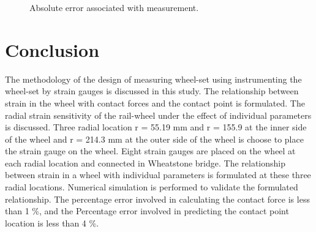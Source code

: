 \documentclass[]{interact}
\theoremstyle{plain}%
\theoremstyle{definition}
\theoremstyle{remark}
\begin{document}
\begin{figure}[h]
\caption{Absolute error associated with measurement.} \label{validation}
\end{figure}


\section{Conclusion}
The methodology of the design of measuring wheel-set using instrumenting the wheel-set by strain gauges is discussed in this study.  The relationship between strain in the wheel with contact forces and the contact point is formulated.  The radial strain sensitivity of the rail-wheel under the effect of individual parameters is discussed. Three radial location r = 55.19 mm and r = 155.9 at the inner side of the wheel and r = 214.3 mm at the outer side of the wheel is choose to place the strain gauge on the wheel. Eight strain gauges are placed on the wheel at each radial location and connected in Wheatstone bridge. The relationship between strain in a wheel with individual parameters is formulated at these three radial locations.  Numerical simulation is performed to validate the formulated relationship. The percentage error involved in calculating the contact force is less than 1 \%, and the Percentage error involved in predicting the contact point location is less than 4 \%. 
\end{document}
